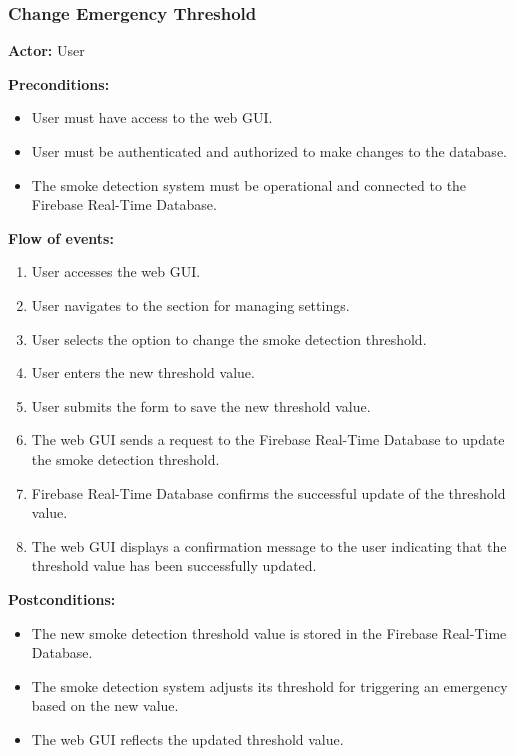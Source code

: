 \subsubsection{Change Emergency Threshold}

\textbf{Actor:} User

\textbf{Preconditions:}
\begin{itemize}
    \item User must have access to the web GUI.
    \item User must be authenticated and authorized to make changes to the database.
    \item The smoke detection system must be operational and connected to the Firebase Real-Time Database.
\end{itemize}

\textbf{Flow of events:}
\begin{enumerate}
    \item User accesses the web GUI.
    \item User navigates to the section for managing settings.
    \item User selects the option to change the smoke detection threshold.
    \item User enters the new threshold value.
    \item User submits the form to save the new threshold value.
    \item The web GUI sends a request to the Firebase Real-Time Database to update the smoke detection threshold.
    \item Firebase Real-Time Database confirms the successful update of the threshold value.
    \item The web GUI displays a confirmation message to the user indicating that the threshold value has been successfully
          updated.
\end{enumerate}

\textbf{Postconditions:}
\begin{itemize}
    \item The new smoke detection threshold value is stored in the Firebase Real-Time Database.
    \item The smoke detection system adjusts its threshold for triggering an emergency based on the new value.
    \item The web GUI reflects the updated threshold value.
\end{itemize}

